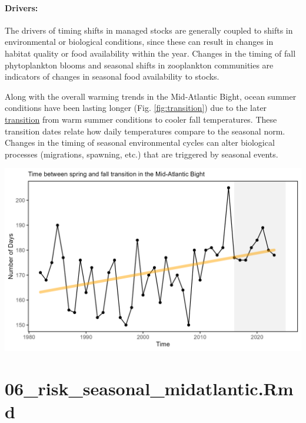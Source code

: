 \documentclass[
  10pt,
]{article}
\let\origfigure\figure
\let\endorigfigure\endfigure
\renewenvironment{figure}[1][2] {
    \expandafter\origfigure\expandafter[H]
} {
    \endorigfigure
}
\begin{document}
\paragraph{Drivers:}\label{drivers-1}

The drivers of timing shifts in managed stocks are generally coupled to shifts in environmental or biological conditions, since these can result in changes in habitat quality or food availability within the year. Changes in the timing of fall phytoplankton blooms and seasonal shifts in zooplankton communities are indicators of changes in seasonal food availability to stocks.

Along with the overall warming trends in the Mid-Atlantic Bight, ocean summer conditions have been lasting longer (Fig. \ref{fig:transition}) due to the later \href{https://noaa-edab.github.io/catalog/trans_dates.html}{transition} from warm summer conditions to cooler fall temperatures. These transition dates relate how daily temperatures compare to the seasonal norm. Changes in the timing of seasonal environmental cycles can alter biological processes (migrations, spawning, etc.) that are triggered by seasonal events.

\begin{figure}

{\centering \includegraphics[width=6.5in]{images/MidAtlantic/transition_date_MidAtlantic_2025-09-05} 

}

\caption{Ocean summer length in the MAB: the annual total number of days between the spring thermal transition date and the fall thermal transition date (black), with an increasing trend (orange).}\label{fig:transition}
\end{figure}

\section{06\_risk\_seasonal\_midatlantic.Rmd}\label{risk_seasonal_midatlantic.rmd}
\end{document}

